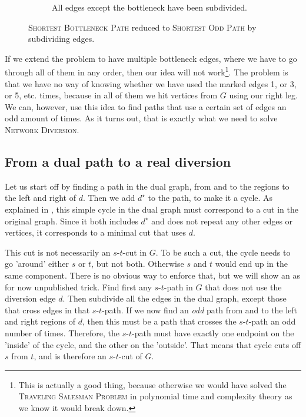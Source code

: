 \begin{figure}[h]
\begin{subfigure}{.80\textwidth}
        \caption{All edges except the bottleneck have been subdivided.}
        \label{figure:subdivided-bottleneck}
    \end{subfigure}%
    \caption{\textsc{Shortest Bottleneck Path} reduced to \textsc{Shortest Odd Path} by subdividing edges.}
    \label{figure:bottleneck-subdividing}
\end{figure}

If we extend the problem to have multiple bottleneck edges, where we have to go through all of them in any order, then our idea will not work\footnote{This is actually a good thing, because otherwise we would have solved the \textsc{Traveling Salesman Problem} in polynomial time and complexity theory as we know it would break down.}.
The problem is that we have no way of knowing whether we have used the marked edges 1, or 3, or 5, etc. times, because in all of them we hit vertices from $G$ using our right leg. We can, however, use this idea to find paths that use a certain set of edges an odd amount of times. As it turns out, that is exactly what we need to solve \textsc{Network Diversion}.

\subsection{From a dual path to a real diversion}
Let us start off by finding a path in the dual graph, from and to the regions to the left and right of $d$. Then we add $d^\star$ to the path, to make it a cycle. As explained in , this simple cycle in the dual graph must correspond to a cut in the original graph. Since it both includes $d^\star$ and does not repeat any other edges or vertices, it corresponds to a minimal cut that uses $d$.

This cut is not necessarily an $s$-$t$-cut in $G$. To be such a cut, the cycle needs to go 'around' either $s$ or $t$, but not both. Otherwise $s$ and $t$ would end up in the same component. There is no obvious way to enforce that, but we will show an as for now unpublished trick. Find first any $s$-$t$-path in $G$ that does not use the diversion edge $d$. Then subdivide all the edges in the dual graph, except those that cross edges in that $s$-$t$-path. If we now find an \emph{odd} path from and to the left and right regions of $d$, then this must be a path that crosses the $s$-$t$-path an odd number of times. Therefore, the $s$-$t$-path must have exactly one endpoint on the 'inside' of the cycle, and the other on the 'outside'. That means that cycle cuts off $s$ from $t$, and is therefore an $s$-$t$-cut of $G$. 


